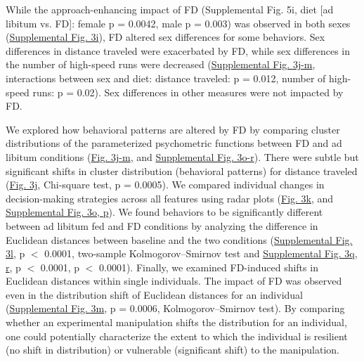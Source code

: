 \documentclass{article}
\begin{document}
\vspace{1em}

While the approach-enhancing impact of FD (Supplemental Fig. 5i, diet [ad libitum vs. FD]: female p = 0.0042, male p = 0.003) was observed in both sexes (\hyperref[fig:Record_SI_3]{Supplemental Fig. 3i}), FD altered sex differences for some behaviors. Sex differences in distance traveled were exacerbated by FD, while sex differences in the number of high-speed runs were decreased (\hyperref[fig:Record_SI_3]{Supplemental Fig. 3j-m}, interactions between sex and diet: distance traveled: p = 0.012, number of high-speed runs: p = 0.02). Sex differences in other measures were not impacted by FD.

\vspace{1em}

We explored how behavioral patterns are altered by FD by comparing cluster distributions of the parameterized psychometric functions between FD and ad libitum conditions (\hyperref[fig:Record_main_3]{Fig. 3j-m}, and \hyperref[fig:Record_SI_3]{Supplemental Fig. 3o-r}). There were subtle but significant shifts in cluster distribution (behavioral patterns) for distance traveled (\hyperref[fig:Record_main_3]{Fig. 3j}, Chi-square test, p = 0.0005). We compared individual changes in decision-making strategies across all features using radar plots (\hyperref[fig:Record_main_3]{Fig. 3k}, and \hyperref[fig:Record_SI_3]{Supplemental Fig. 3o, p}). We found behaviors to be significantly different between ad libitum fed and FD conditions by analyzing the difference in Euclidean distances between baseline and the two conditions (\hyperref[fig:Record_SI_3]{Supplemental Fig. 3l}, p $<$ 0.0001, two-sample Kolmogorov–Smirnov test and \hyperref[fig:Record_SI_3]{Supplemental Fig. 3q, r}, p $<$ 0.0001, p $<$ 0.0001). Finally, we examined FD-induced shifts in Euclidean distances within single individuals. The impact of FD was observed even in the distribution shift of Euclidean distances for an individual (\hyperref[fig:Record_SI_3]{Supplemental Fig. 3m}, p = 0.0006, Kolmogorov–Smirnov test). By comparing whether an experimental manipulation shifts the distribution for an individual, one could potentially characterize the extent to which the individual is resilient (no shift in distribution) or vulnerable (significant shift) to the manipulation.
\end{document}

